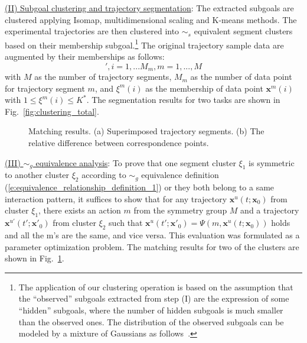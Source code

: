\documentclass[journal]{IEEEtran}
\begin{document}
\underline{(II) Subgoal clustering and trajectory segmentation}: The extracted subgoals are clustered applying Isomap, multidimensional scaling and K-means methods. The experimental trajectories are then clustered into $\sim_s$ equivalent segment clusters based on their membership subgoal.\footnote{The application of our clustering operation is based on the assumption that the ``observed'' subgoals extracted from step (I) are the expression of some ``hidden'' subgoals, where the number of hidden subgoals is much smaller than the observed ones. The distribution of the observed subgoals can be modeled by a mixture of Gaussians as follows~\cite{bishop2006pattern}.} The original trajectory sample data are augmented by their memberships as follows:
\begin{equation*} 
[\mathbf{x}^m(i)',\xi^m(i)]', i = 1,...M_m, m = 1,...,M
\end{equation*} 
with $M$ as the number of trajectory segments, $M_m$ as the number of data point for trajectory segment $m$, and $\xi^m(i)$ as the membership of data point $\mathbf{x}^m(i)$ with $1 \leq \xi^m(i) \leq K^*$. The segmentation results for two tasks are shown in Fig.~\ref{fig:clustering_total}. 

\begin{figure}[!t]
\centering
{}
\caption{Matching results. (a) Superimposed trajectory segments. (b) The relative difference between correspondence points.} \label{fig:Single_Matching}
\end{figure}

\underline{(III) $\sim_g$ equivalence analysis}: To prove that one segment cluster $\xi_1$ is symmetric to another cluster $\xi_2$ according to $\sim_g$ equivalence definition (\ref{e:equivalence_relationship_definition_1}) or they both belong to a same interaction pattern, it suffices to show that for any trajectory $\mathbf{x}^u(t;\mathbf{x}_0)$ from cluster $\xi_1$, there exists an action $m$ from the symmetry group $M$ and a trajectory $\mathbf{x}^{u'}(t';\mathbf{x}'_0)$ from cluster $\xi_2$ such that $\mathbf{x}^{u}(t';\mathbf{x}'_0) = \Psi(m,\mathbf{x}^u(t;\mathbf{x}_0))$ holds and all the m's are the same, and vice versa. This evaluation was formulated as a parameter optimization problem. The matching results for two of the clusters are shown in Fig.~\ref{fig:Single_Matching}.
\end{document}
